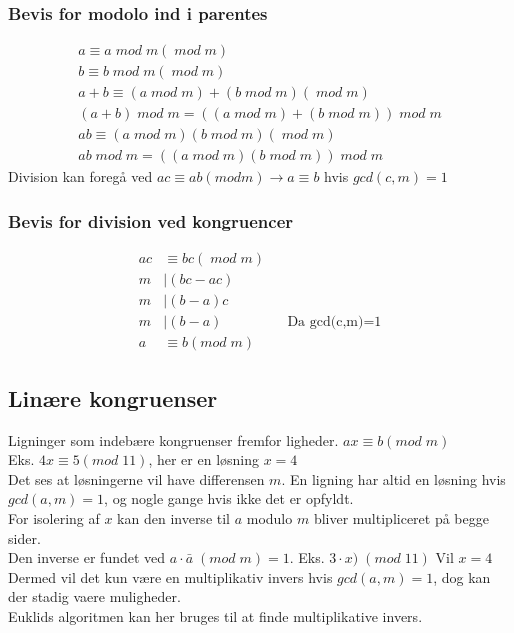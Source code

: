 \documentclass[12pt, a4paper]{article}
\begin{document}
				\subsubsection{Bevis for modolo ind i parentes}
					\begin{align*}
						a\equiv a \; mod \; m (\; mod \; m)\\
						b \equiv b \; mod \; m (\; mod \; m)\\
						a+b\equiv (a \; mod \; m) + (b \; mod \; m) (\; mod \; m)\\
						(a+b) \; mod \; m = ((a \; mod \; m) + (b \; mod \; m)) \; mod \; m\\[4mm]
						ab\equiv (a \; mod \; m)(b \; mod \; m) (\; mod \; m)\\
						ab \; mod \; m = ((a \; mod \; m )(b \; mod \; m)) \; mod \; m
					\end{align*}
				Division kan foregå ved $ac\equiv ab (mod m)\rightarrow a\equiv b$ hvis $gcd(c,m)=1$\\
				\subsubsection{Bevis for division ved kongruencer}
					\begin{align*}
						ac&\equiv bc (\;mod\; m)\\
						m&|(bc-ac)\\
						m&|(b-a)c\\
						m&|(b-a) &&\text{Da gcd(c,m)=1}\\
						a&\equiv b (mod\; m)
					\end{align*}
			\subsection{Linære kongruenser}
				Ligninger som indebære kongruenser fremfor ligheder. $ax\equiv b (mod\; m)$\\
				Eks. $4x\equiv 5 (mod\; 11)$, her er en løsning $x=4$\\
				Det ses at løsningerne vil have differensen $m$.
				En ligning har altid en løsning hvis $gcd(a,m)=1$, og nogle gange hvis ikke det er opfyldt.\\
				For isolering af $x$ kan den inverse til $a$ modulo $m$ bliver multipliceret på begge sider.\\
				Den inverse er fundet ved $a\cdot \bar{a}\;(mod\;m)=1$. Eks. $3\cdot x)\;(mod\;11)$ Vil $x=4$\\
				Dermed vil det kun være en multiplikativ invers hvis $gcd(a,m)=1$, dog kan der stadig vaere muligheder.\\
				Euklids algoritmen kan her bruges til at finde multiplikative invers.\\
				
\end{document}

